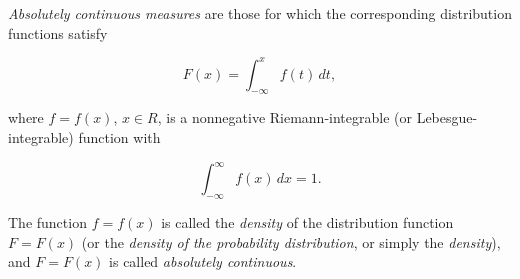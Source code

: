 \textit{Absolutely continuous measures} are those for which the corresponding distribution functions satisfy

$$F(x) = \int_{-\infty}^{x} f(t)\,dt,$$

where $f = f(x)$, $x \in R$, is a nonnegative Riemann-integrable (or Lebesgue-integrable) function with

$$\int_{-\infty}^{\infty} f(x)\,dx = 1.$$

The function $f = f(x)$ is called the \textit{density} of the distribution function $F = F(x)$ (or the \textit{density of the probability distribution}, or simply the \textit{density}), and $F = F(x)$ is called \textit{absolutely continuous}.
